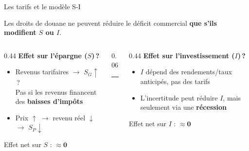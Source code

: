 \documentclass[aspectratio=169]{beamer}
\begin{document}
\begin{frame}[t]{Les tarifs et le modèle S-I}\examtag
   \small
   \begin{warning}
      \footnotesize
      Les droits de douane ne peuvent réduire le déficit commercial \textbf{que s'ils modifient $S$ ou $I$}.
   \end{warning}
   \vspace{0.2cm}
   \begin{columns}[T]
      \begin{column}{0.44\textwidth}
         \quad \textbf{Effet sur l'épargne ($S$)\,?}
         \vspace{0.1cm}
         \begin{itemize}
            \setlength\itemsep{0.12cm}
            \item Revenus tarifaires $\to$ $S_G \uparrow$\,?\\
                  Pas si les revenus financent des \textbf{baisses d'impôts}
            \item Prix $\uparrow$ $\to$ revenu réel $\downarrow$ $\to$ $S_P \downarrow$
         \end{itemize}
         \vspace{0.1cm}
         \centering
         Effet net sur $S$ : $\boldsymbol{\approx 0}$
      \end{column}
      \begin{column}{0.06\textwidth}
         \centering
         \vspace{0.2cm}
         {\textcolor{HECgray}{\rule{0.5pt}{3.5cm}}}
      \end{column}
      \begin{column}{0.44\textwidth}
         \quad \textbf{Effet sur l'investissement ($I$)\,?}
         \vspace{0.1cm}
         \begin{itemize}
            \setlength\itemsep{0.12cm}
            \item $I$ dépend des rendements/taux anticipés, pas des tarifs
            \item L'incertitude peut réduire $I$, mais seulement via une \textbf{récession}
         \end{itemize}
         \vspace{0.1cm}
         \centering
         Effet net sur $I$ : $\boldsymbol{\approx 0}$
      \end{column}
   \end{columns}
\end{frame}
\end{document}
